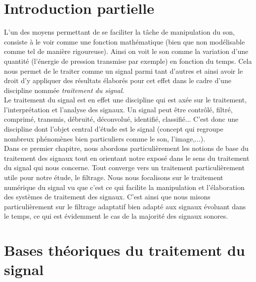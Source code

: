 \section{Introduction partielle}
L'un des moyens permettant de se faciliter la tâche de manipulation du son, consiste à le voir comme une fonction mathématique (bien que non modélisable comme tel de manière rigoureuse). Ainsi on voit le son comme la variation d'une quantité (l'énergie de pression transmise par exemple) en fonction du temps. Cela nous permet de le traiter comme un signal parmi tant d'autres et ainsi avoir le droit d'y appliquer des résultats élaborés pour cet effet dans le cadre d'une discipline nommée \emph{traitement du signal}.\\
Le traitement du signal est en effet une discipline qui est axée sur le traitement, l'interprétation et l'analyse des signaux. Un signal peut être contrôlé, filtré, comprimé, transmis, débruité, déconvolué, identifié, classifié... C'est donc une discipline dont l'objet central d'étude est le signal (concept qui regroupe nombreux phénomènes bien particuliers comme le son, l'image,...).\\
Dans ce premier chapitre, nous abordons particulièrement les notions de base du traitement des signaux tout en orientant notre exposé dans le sens du traitement du signal qui nous concerne. Tout converge vers un traitement particulièrement utile pour notre étude, le filtrage. Nous nous focalisons sur le traitement numérique du signal vu que c'est ce qui facilite la manipulation et l'élaboration des systèmes de traitement des signaux. C'est ainsi que nous misons particulièrement sur le filtrage adaptatif bien adapté aux signaux évoluant dans le temps, ce qui est évidemment le cas de la majorité des signaux sonores.
\section{Bases théoriques du traitement du signal}
